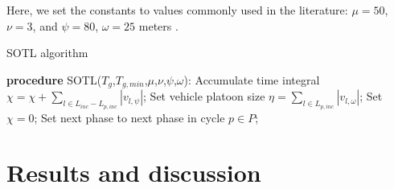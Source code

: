 \documentclass[journal]{IEEEtran}
\begin{document}
Here, we set the constants to values commonly used in the literature: $\mu = 50$, $\nu = 3$, and $\psi = 80$, $\omega = 25$ meters \cite{placzek2014self}. \\

\begin{algorithm}[H]
\caption*{SOTL algorithm}
\begin{algorithmic}
    \STATE \textbf{procedure} SOTL($T_g$,$T_{g,min}$,$\mu$,$\nu$,$\psi$,$\omega$):
    \STATE Accumulate time integral $\chi = \chi + \sum_{l \in L_{inc} - L_{p,inc}} |v_{l,\psi}|$;
        \STATE Set vehicle platoon size $\eta = \sum_{l \in L_{p,inc}} |v_{l,\omega}|$;
            \STATE Set $\chi = 0$;
            \STATE Set next phase to next phase in cycle $p \in P$;
        \ENDIF
    \ENDIF 
\end{algorithmic}
\end{algorithm}

\section{Results and discussion}
\label{sec:results}
\end{document}
